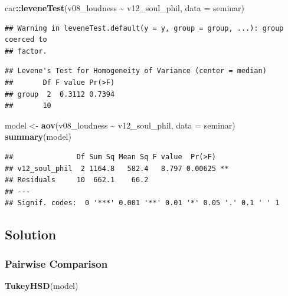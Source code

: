 \documentclass[
]{book}
\newenvironment{Shaded}{\begin{snugshade}}{\end{snugshade}}
\newcommand{\AttributeTok}[1]{\textcolor[rgb]{0.13,0.29,0.53}{#1}}
\newcommand{\FunctionTok}[1]{\textcolor[rgb]{0.13,0.29,0.53}{\textbf{#1}}}
\newcommand{\NormalTok}[1]{#1}
\newcommand{\OtherTok}[1]{\textcolor[rgb]{0.56,0.35,0.01}{#1}}
\newcommand{\SpecialCharTok}[1]{\textcolor[rgb]{0.81,0.36,0.00}{\textbf{#1}}}
\begin{document}
\begin{Shaded}
\begin{Highlighting}[]
\NormalTok{car}\SpecialCharTok{::}\FunctionTok{leveneTest}\NormalTok{(v08\_loudness }\SpecialCharTok{\textasciitilde{}}\NormalTok{ v12\_soul\_phil, }\AttributeTok{data =}\NormalTok{ seminar)}
\end{Highlighting}
\end{Shaded}

\begin{verbatim}
## Warning in leveneTest.default(y = y, group = group, ...): group coerced to
## factor.
\end{verbatim}

\begin{verbatim}
## Levene's Test for Homogeneity of Variance (center = median)
##       Df F value Pr(>F)
## group  2  0.3112 0.7394
##       10
\end{verbatim}

\begin{Shaded}
\begin{Highlighting}[]
\NormalTok{model }\OtherTok{\textless{}{-}} \FunctionTok{aov}\NormalTok{(v08\_loudness }\SpecialCharTok{\textasciitilde{}}\NormalTok{ v12\_soul\_phil, }\AttributeTok{data =}\NormalTok{ seminar)}
\FunctionTok{summary}\NormalTok{(model)}
\end{Highlighting}
\end{Shaded}

\begin{verbatim}
##               Df Sum Sq Mean Sq F value  Pr(>F)   
## v12_soul_phil  2 1164.8   582.4   8.797 0.00625 **
## Residuals     10  662.1    66.2                   
## ---
## Signif. codes:  0 '***' 0.001 '**' 0.01 '*' 0.05 '.' 0.1 ' ' 1
\end{verbatim}

\subsection{\texorpdfstring{Solution }{Solution }}\label{solution-15}

\subsubsection{Pairwise Comparison}\label{pairwise-comparison}

\begin{Shaded}
\begin{Highlighting}[]
\FunctionTok{TukeyHSD}\NormalTok{(model)}
\end{Highlighting}
\end{Shaded}
\end{document}

